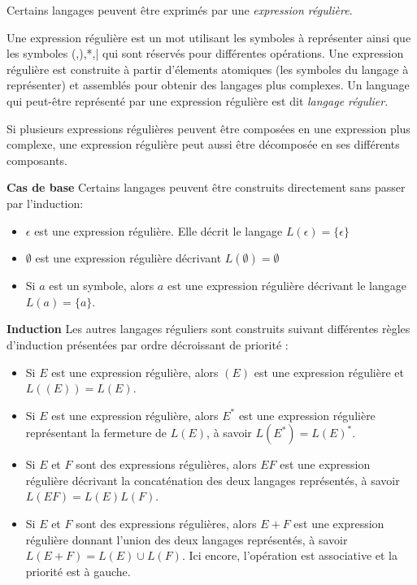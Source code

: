 
Certains langages peuvent être exprimés par une \emph{expression régulière}.

Une expression régulière est un mot utilisant les symboles à représenter ainsi que les symboles (,),*,| qui sont réservés pour différentes opérations. Une expression régulière est construite à partir d'élements atomiques (les symboles du langage à représenter) et assemblés pour obtenir des langages plus complexes. Un language qui peut-être représenté par une expression régulière est dit \emph{langage régulier}.

Si plusieurs expressions régulières peuvent être composées en une expression plus complexe, une expression régulière peut aussi être décomposée en ses différents composants.

\textbf{Cas de base}
Certains langages peuvent être construits directement sans passer par l'induction:

\begin{itemize}
	\item $\epsilon$ est une expression régulière. Elle décrit le langage $L(\epsilon)=\{\epsilon\}$
	\item $\emptyset$ est une expression régulière décrivant $L(\emptyset)=\emptyset$
	\item Si $a$ est un symbole, alors $a$ est une expression régulière décrivant le langage $L(a) = \{a\}$.
\end{itemize}


\textbf{Induction}
Les autres langages réguliers sont construits suivant différentes règles d'induction présentées par ordre décroissant de priorité :

\begin{itemize}
	\item Si $E$ est une expression régulière, alors $(E)$ est une expression régulière et $L((E)) = L(E)$.
	\item Si $E$ est une expression régulière, alors $E^*$ est une expression régulière représentant la fermeture de $L(E)$, à savoir $L(E^*) = L(E)^*$.
	\item Si $E$ et $F$ sont des expressions régulières, alors $EF$ est une expression régulière décrivant la concaténation des deux langages représentés, à savoir $L(EF)=L(E)L(F)$.
	\item Si $E$ et $F$ sont des expressions régulières, alors $E+F$ est une expression régulière donnant l'union des deux langages représentés, à savoir $L(E+F)=L(E)\cup L(F)$. Ici encore, l'opération est associative et la priorité est à gauche.
\end{itemize}

